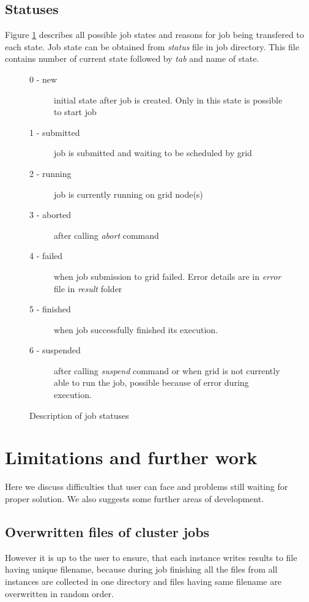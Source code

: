 \documentclass[a4paper,10pt,twocolumn]{article}
\newcommand{\code}[1]{\textit{#1}}
\begin{document}
\subsection{Statuses}

Figure \ref{statuses} describes all possible job states and reasons for job being transfered to each state. Job state can be obtained from \code{status} file in job directory. This file contains number of current state followed by \code{tab} and name of state.

\begin{figure}[h]
  \begin{description}
   \item[0 - new] initial state after job is created. Only in this state is possible to start job
   \item[1 - submitted] job is submitted and waiting to be scheduled by grid
   \item[2 - running] job is currently running on grid node(s)
   \item[3 - aborted] after calling \code{abort} command
   \item[4 - failed] when job submission to grid failed. Error details are in \code{error} file in \code{result} folder
   \item[5 - finished] when job successfully finished its execution.
   \item[6 - suspended] after calling \code{suspend} command or when grid is not currently able to run the job, possible because of error during execution.
  \end{description}
  \caption{Description of job statuses}
  \label{statuses}
\end{figure}



\section{Limitations and further work}

Here we discuss difficulties that user can face and problems still waiting for proper solution. We also suggests some further areas of development.

\subsection{Overwritten files of cluster jobs}
However it is up to the user to ensure, that each instance writes results to file having unique filename, because during job finishing all the files from all instances are collected in one directory and files having same filename are overwritten in random order.



\end{document}
